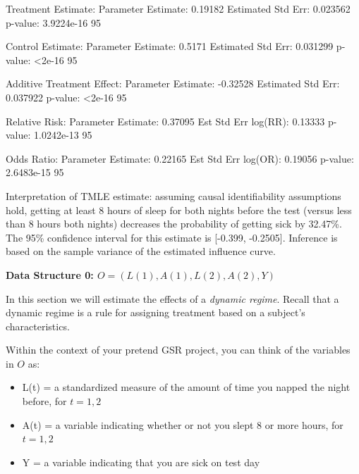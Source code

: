 \documentclass{exam}
\begin{document}
\begin{solution}
\begin{Schunk}
\begin{Soutput}
Treatment Estimate:
   Parameter Estimate:  0.19182 
    Estimated Std Err:  0.023562 
              p-value:  3.9224e-16 
    95%

Control Estimate:
   Parameter Estimate:  0.5171 
    Estimated Std Err:  0.031299 
              p-value:  <2e-16 
    95%

Additive Treatment Effect:
   Parameter Estimate:  -0.32528 
    Estimated Std Err:  0.037922 
              p-value:  <2e-16 
    95%

Relative Risk:
   Parameter Estimate:  0.37095 
  Est Std Err log(RR):  0.13333 
              p-value:  1.0242e-13 
    95%

Odds Ratio:
   Parameter Estimate:  0.22165 
  Est Std Err log(OR):  0.19056 
              p-value:  2.6483e-15 
    95%
\end{Soutput}
\end{Schunk}

Interpretation of TMLE estimate: assuming causal identifiability assumptions hold, getting at least 8 hours of sleep for both nights before the test (versus less than 8 hours both nights) decreases the probability of getting sick by 32.47\%. The 95\% confidence interval for this estimate is [-0.399, -0.2505]. Inference is based on the sample variance of the estimated influence curve. 

\end{solution}

\noindent\large\textbf{Data Structure 0: $O = (L(1), A(1), L(2), A(2), Y)$}
\normalsize

\noindent In this section we will estimate the effects of a \textit{dynamic regime}. Recall that a dynamic regime is a rule for assigning treatment based on a subject's characteristics. 

Within the context of your pretend GSR project, you can think of the variables in $O$ as:
\begin{itemize}
\item L(t) = a standardized measure of the amount of time you napped the night before, for $t = 1,2$
\item A(t) = a variable indicating whether or not you slept 8 or more hours, for $t = 1,2$
\item Y = a variable indicating that you are sick on test day 
\end{itemize}
\end{document}
